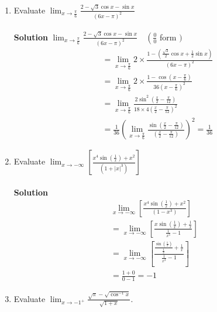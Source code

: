 \begin{enumerate}
    \item Evaluate $\lim _{x \rightarrow \frac{\pi}{6}} \frac{2-\sqrt{3} \cos x-\sin x}{(6 x-\pi)^2}$\\\\
\textbf{Solution} $\lim _{x \rightarrow \frac{\pi}{6}} \frac{2-\sqrt{3} \cos x-\sin x}{(6 x-\pi)^2} \quad\left(\frac{0}{0}\right.$ form $)$
$$
\begin{aligned}
& =\lim _{x \rightarrow \frac{\pi}{6}} 2 \times \frac{1-\left(\frac{\sqrt{3}}{2} \cos x+\frac{1}{2} \sin x\right)}{(6 x-\pi)^2} \\
& =\lim _{x \rightarrow \frac{\pi}{6}} 2 \times \frac{1-\cos \left(x-\frac{\pi}{6}\right)}{36\left(x-\frac{\pi}{6}\right)^2} \\
& =\lim _{x \rightarrow \frac{\pi}{6}} \frac{2 \sin ^2\left(\frac{x}{2}-\frac{\pi}{12}\right)}{18 \times 4\left(\frac{x}{2}-\frac{\pi}{12}\right)^2} \\
& =\frac{1}{36}\left(\lim _{x \rightarrow \frac{\pi}{6}} \frac{\sin \left(\frac{x}{2}-\frac{\pi}{12}\right)}{\left(\frac{x}{2}-\frac{\pi}{12}\right)}\right)^2=\frac{1}{36}
\end{aligned}
$$

\newpage
\item Evaluate $\lim _{x \rightarrow-\infty}\left[\frac{x^4 \sin \left(\frac{1}{x}\right)+x^2}{\left(1+|x|^3\right)}\right]$\\\\

\textbf{Solution}
$$
\begin{gathered}
\lim _{x \rightarrow-\infty}\left[\frac{x^4 \sin \left(\frac{1}{x}\right)+x^2}{\left(1-x^3\right)}\right] \\
=\lim _{x \rightarrow-\infty}\left[\frac{x \sin \left(\frac{1}{x}\right)+\frac{1}{x}}{\frac{1}{x^3}-1}\right] \\
=\lim _{x \rightarrow-\infty}\left[\frac{\frac{\sin \left(\frac{1}{x}\right)}{\frac{1}{x}}+\frac{1}{x}}{\frac{1}{x^3}-1}\right] \\
=\frac{1+0}{0-1}=-1
\end{gathered}
$$

\item Evaluate $\lim _{x \rightarrow-1^{+}} \frac{\sqrt{\pi}-\sqrt{\cos ^{-1} x}}{\sqrt{1+x}}$.\\\\


\end{enumerate}

